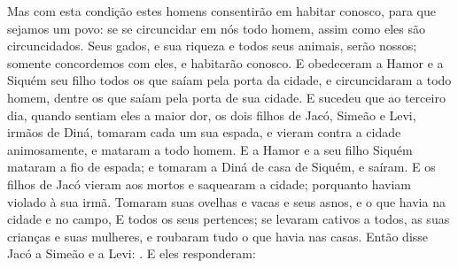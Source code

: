 {{{  Mas com esta condição estes homens consentirão em habitar conosco, para que sejamos um povo: se se circuncidar em nós todo homem, assim como eles são circuncidados. %
  Seus gados, e sua riqueza e todos seus animais, serão nossos; somente concordemos com eles, e habitarão conosco}. %
  E obedeceram a Hamor e a Siquém seu filho todos os que saíam pela porta da cidade, e circuncidaram a todo homem, dentre os que saíam pela porta de sua cidade.
  E sucedeu que ao terceiro dia, quando sentiam eles a maior dor, os dois filhos de Jacó, Simeão e Levi, irmãos de Diná, tomaram cada um sua espada, e vieram contra a cidade animosamente, e mataram a todo homem.
  E a Hamor e a seu filho Siquém mataram a fio de espada; e tomaram a Diná de casa de Siquém, e saíram.
  E os filhos de Jacó vieram aos mortos e saquearam a cidade; porquanto haviam violado à sua irmã.
  Tomaram suas ovelhas e vacas e seus asnos, e o que havia na cidade e no campo,
  E todos os seus pertences; se levaram cativos a todos, as suas crianças e suas mulheres, e roubaram tudo o que havia nas casas.
  Então disse Jacó a Simeão e a Levi: .
  E eles responderam:  %
\par }

}
